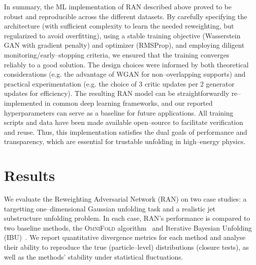 {{    In summary, the ML implementation of RAN described above proved to be robust and reproducible across the different datasets.
    By carefully specifying the architecture (with sufficient complexity to learn the needed reweighting, but regularized to avoid overfitting), using a stable training objective (Wasserstein GAN with gradient penalty) and optimizer (RMSProp), and employing diligent monitoring/early--stopping criteria, we ensured that the training converges reliably to a good solution.
    The design choices were informed by both theoretical considerations (e.g. the advantage of WGAN for non--overlapping supports) and practical experimentation (e.g. the choice of 3 critic updates per 2 generator updates for efficiency).
    The resulting RAN model can be straightforwardly re--implemented in common deep learning frameworks, and our reported hyperparameters can serve as a baseline for future applications.
    All training scripts and data have been made available open--source to facilitate verification and reuse.
    Thus, this implementation satisfies the dual goals of performance and transparency, which are essential for trustable unfolding in high--energy physics.

\section{Results}
    \label{sec:ran-results}
    We evaluate the Reweighting Adversarial Network (RAN) on two case studies: a targetting one--dimensional Gaussian unfolding task and a realistic jet substructure unfolding problem.
    In each case, RAN’s performance is compared to two baseline methods, the \textsc{OmniFold} algorithm~ and Iterative Bayesian Unfolding (IBU)~.
    We report quantitative divergence metrics for each method and analyse their ability to reproduce the true (particle--level) distributions (closure tests), as well as the methods’ stability under statistical fluctuations.

}}

